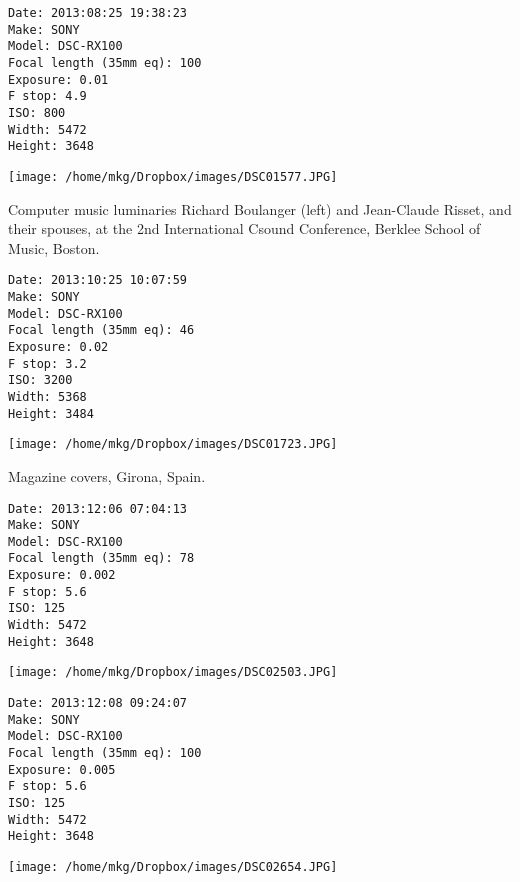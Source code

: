 \begin{lstlisting}
Date: 2013:08:25 19:38:23
Make: SONY
Model: DSC-RX100
Focal length (35mm eq): 100
Exposure: 0.01
F stop: 4.9
ISO: 800
Width: 5472
Height: 3648

\end{lstlisting}

\clearpage
\texttt{[image: /home/mkg/Dropbox/images/DSC01577.JPG]}

\clearpage

\noindent Computer music luminaries Richard Boulanger (left) and Jean-Claude Risset, and their spouses, at the 2nd International Csound Conference, Berklee School of Music, Boston.

\begin{lstlisting}
Date: 2013:10:25 10:07:59
Make: SONY
Model: DSC-RX100
Focal length (35mm eq): 46
Exposure: 0.02
F stop: 3.2
ISO: 3200
Width: 5368
Height: 3484

\end{lstlisting}

\clearpage
\texttt{[image: /home/mkg/Dropbox/images/DSC01723.JPG]}

\clearpage

\noindent Magazine covers, Girona, Spain.

\begin{lstlisting}
Date: 2013:12:06 07:04:13
Make: SONY
Model: DSC-RX100
Focal length (35mm eq): 78
Exposure: 0.002
F stop: 5.6
ISO: 125
Width: 5472
Height: 3648

\end{lstlisting}

\clearpage
\texttt{[image: /home/mkg/Dropbox/images/DSC02503.JPG]}

\clearpage

\noindent 

\begin{lstlisting}
Date: 2013:12:08 09:24:07
Make: SONY
Model: DSC-RX100
Focal length (35mm eq): 100
Exposure: 0.005
F stop: 5.6
ISO: 125
Width: 5472
Height: 3648

\end{lstlisting}

\clearpage
\texttt{[image: /home/mkg/Dropbox/images/DSC02654.JPG]}

\clearpage

\noindent 

